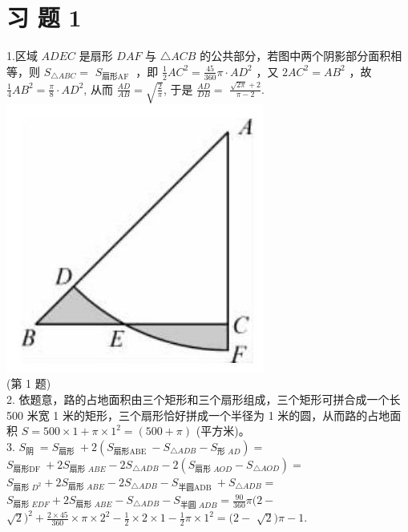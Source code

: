 \documentclass[10pt]{article}
\begin{document}
\section*{习 题 1}
1.区域 $A D E C$ 是扇形 $D A F$ 与 $\triangle A C B$ 的公共部分，若图中两个阴影部分面积相等，则 $S_{\triangle A B C}=$ $S_{\text {扇形AF }}$ ，即 $\frac{1}{2} A C^{2}=\frac{45}{360} \pi \cdot A D^{2}$ ，又 $2 A C^{2}=A B^{2}$ ，故 $\frac{1}{4} A B^{2}=\frac{\pi}{8} \cdot A D^{2}$, 从而 $\frac{A D}{A B}=\sqrt{\frac{2}{\pi}}$, 于是 $\frac{A D}{D B}=$ $\frac{\sqrt{2 \pi}+2}{\pi-2}$.\\
\includegraphics[max width=\textwidth, center]{2024_10_30_66b8e5e701da2093c133g-085(1)}\\
(第 1 题)\\
2. 依题意，路的占地面积由三个矩形和三个扇形组成，三个矩形可拼合成一个长 500 米宽 1 米的矩形，三个扇形恰好拼成一个半径为 1 米的圆，从而路的占地面积 $S=500 \times 1+\pi \times 1^{2}=(500+\pi)$ (平方米)。\\
3. $S_{\text {阴 }}=S_{\text {扇形 }}+2\left(S_{\text {扇形ABE }}-S_{\triangle A D B}-S_{\text {形 } A D}\right)=$ $S_{\text {扇形DF }}+2 S_{\text {扇形 } A B E}-2 S_{\triangle A D B}-2\left(S_{\text {扇形 } A O D}-S_{\triangle A O D}\right)=$ $S_{\text {扇形 } D^{2}}+2 S_{\text {扇形 } A B E}-2 S_{\triangle A D B}-S_{\text {半圆ADB }}+S_{\triangle A D B}=$ $S_{\text {扇形 } E D F}+2 S_{\text {扇形 } A B E}-S_{\triangle A D B}-S_{\text {半圆 } A D B}=\frac{90}{360} \pi(2-$ $\sqrt{2})^{2}+\frac{2 \times 45}{360} \times \pi \times 2^{2}-\frac{1}{2} \times 2 \times 1-\frac{1}{2} \pi \times 1^{2}=(2-$ $\sqrt{2}) \pi-1$.\\
\end{document}
